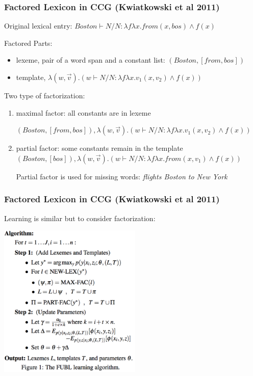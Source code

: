\documentclass{beamer}
\begin{document}
\begin{frame}
    \frametitle{Factored Lexicon in CCG (Kwiatkowski et al 2011)}

    Original lexical entry: $Boston \vdash N / N:\lambda f\lambda x.from(x, bos) \wedge f(x)$

    Factored Parts:
    \begin{itemize}
        \item lexeme, pair of a word span and a constant list: $(Boston,[from,bos])$
        \item template, $\lambda (w, \vec v).(w \vdash N / N:\lambda f\lambda x.v_1(x, v_2) \wedge f(x))$
    \end{itemize}

    \pause

    Two type of factorization:
    \begin{enumerate}
        \item maximal factor: all constants are in lexeme

            $(Boston, [from, bos]),  
            \lambda (w, \vec v).(w \vdash N / N:\lambda f\lambda x.v_1(x, v_2) \wedge f(x))$

        \item partial factor: some constants remain in the template
            $(Boston, [bos]), 
            \lambda (w, \vec v).(w \vdash N / N:\lambda f\lambda x.from(x, v_1) \wedge f(x))$

            Partial factor is used for missing words: \emph{flights Boston to New York}
    \end{enumerate}

\end{frame}

\begin{frame}
    \frametitle{Factored Lexicon in CCG (Kwiatkowski et al 2011)}

    Learning is similar but to consider factorization:

    \begin{center}
        \includegraphics[width=6.8cm,height=7.34cm]{img/fubl.png}
    \end{center}

\end{frame}
\end{document}
